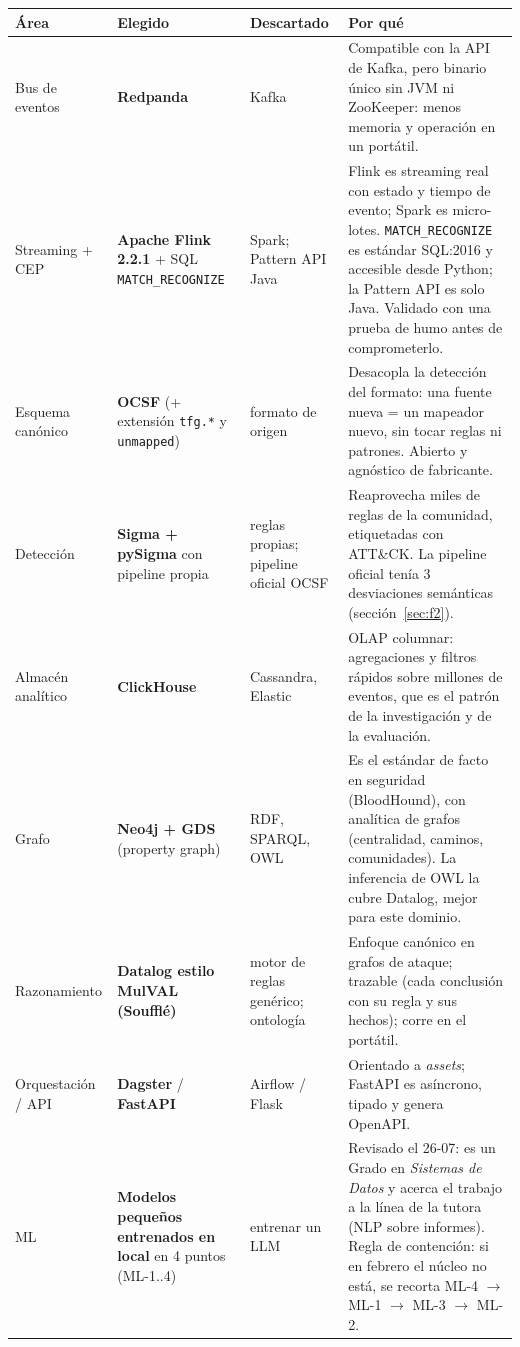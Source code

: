 \documentclass[11pt,a4paper]{article}
\newcommand{\cod}[1]{\texttt{#1}}
\newcommand{\flecha}{$\rightarrow$}
\begin{document}
\begin{center}
\small
\renewcommand{\arraystretch}{1.25}
\begin{longtable}{>{\raggedright\arraybackslash}p{2.4cm} >{\raggedright\arraybackslash}p{3.1cm} >{\raggedright\arraybackslash}p{2.5cm} >{\raggedright\arraybackslash}p{6.2cm}}
\toprule
Área & Elegido & Descartado & Por qué \\
\midrule
\endhead
Bus de eventos & \textbf{Redpanda} & Kafka & Compatible con la API de Kafka, pero binario único sin JVM ni ZooKeeper: menos memoria y operación en un portátil. \\
Streaming + CEP & \textbf{Apache Flink 2.2.1} + SQL \cod{MATCH\_RECOGNIZE} & Spark; Pattern API Java & Flink es streaming real con estado y tiempo de evento; Spark es micro-lotes. \cod{MATCH\_RECOGNIZE} es estándar SQL:2016 y accesible desde Python; la Pattern API es solo Java. Validado con una prueba de humo antes de comprometerlo. \\
Esquema canónico & \textbf{OCSF} (+ extensión \cod{tfg.*} y \cod{unmapped}) & formato de origen & Desacopla la detección del formato: una fuente nueva = un mapeador nuevo, sin tocar reglas ni patrones. Abierto y agnóstico de fabricante. \\
Detección & \textbf{Sigma + pySigma} con pipeline propia & reglas propias; pipeline oficial OCSF & Reaprovecha miles de reglas de la comunidad, etiquetadas con ATT\&CK. La pipeline oficial tenía 3 desviaciones semánticas (sección~\ref{sec:f2}). \\
Almacén analítico & \textbf{ClickHouse} & Cassandra, Elastic & OLAP columnar: agregaciones y filtros rápidos sobre millones de eventos, que es el patrón de la investigación y de la evaluación. \\
Grafo & \textbf{Neo4j + GDS} (property graph) & RDF, SPARQL, OWL & Es el estándar de facto en seguridad (BloodHound), con analítica de grafos (centralidad, caminos, comunidades). La inferencia de OWL la cubre Datalog, mejor para este dominio. \\
Razonamiento & \textbf{Datalog estilo MulVAL (Soufflé)} & motor de reglas genérico; ontología & Enfoque canónico en grafos de ataque; trazable (cada conclusión con su regla y sus hechos); corre en el portátil. \\
Orquestación / API & \textbf{Dagster} / \textbf{FastAPI} & Airflow / Flask & Orientado a \textit{assets}; FastAPI es asíncrono, tipado y genera OpenAPI. \\
ML & \textbf{Modelos pequeños entrenados en local} en 4 puntos (ML-1..4) & entrenar un LLM & Revisado el 26-07: es un Grado en \textit{Sistemas de Datos} y acerca el trabajo a la línea de la tutora (NLP sobre informes). Regla de contención: si en febrero el núcleo no está, se recorta ML-4 \flecha{} ML-1 \flecha{} ML-3 \flecha{} ML-2. \\

\end{longtable}
\end{center}
\end{document}
